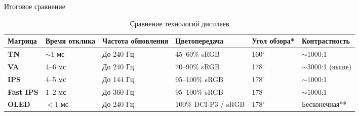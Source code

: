\documentclass{beamer}
\begin{document}
	\begin{frame}{Итоговое сравнение}
		\scriptsize

		\begin{table}[h!]
			\centering
			\begin{tabular}{|p{1.2cm}|p{1.2cm}|p{1.7cm}|p{2cm}|p{1.1cm}|p{2.1cm}|}
			\hline
			\textbf{Матрица} & \textbf{Время отклика} & \textbf{Частота обновления} & \textbf{Цветопередача} & \textbf{Угол обзора*} & \textbf{Контрастность} \\ \hline
			\textbf{TN}         & $\sim$1 мс            & До 240 Гц                   & 45--60\% sRGB          & 160$^\circ$                  & $\sim$1000:1           \\ \hline
			\textbf{VA}         & 4--6 мс               & До 240 Гц                   & 70--90\% sRGB          & 178$^\circ$                  & $\sim$3000:1 (выше)    \\ \hline
			\textbf{IPS}        & 4--5 мс               & До 144 Гц                   & 95--100\% sRGB         & 178$^\circ$                  & $\sim$1000:1           \\ \hline
			\textbf{Fast IPS}   & 1--2 мс               & До 360 Гц                   & 95--100\% sRGB         & 178$^\circ$                  & $\sim$1000:1           \\ \hline
			\textbf{OLED}       & $<$1 мс               & До 240 Гц                   & 100\% DCI-P3 / sRGB    & 178$^\circ$                  & Бесконечная**            \\ \hline
			\end{tabular}
			\caption{Сравнение технологий дисплеев}
			\label{tab:display_technologies}
			\end{table}

		\fi


\end{frame}
\end{document}
